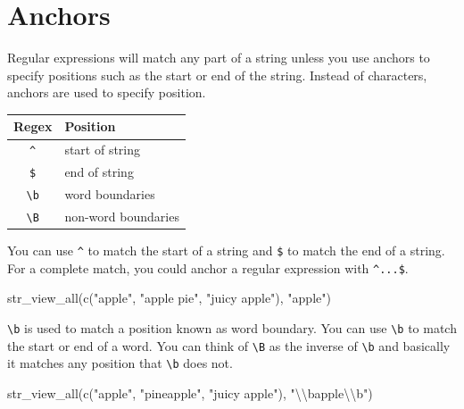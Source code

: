 \documentclass[
]{book}
\newenvironment{Shaded}{\begin{snugshade}}{\end{snugshade}}
\newcommand{\FunctionTok}[1]{\textcolor[rgb]{0.00,0.00,0.00}{#1}}
\newcommand{\NormalTok}[1]{#1}
\newcommand{\SpecialCharTok}[1]{\textcolor[rgb]{0.00,0.00,0.00}{#1}}
\newcommand{\StringTok}[1]{\textcolor[rgb]{0.31,0.60,0.02}{#1}}
\begin{document}
\hypertarget{anchors}{%
\section{Anchors}\label{anchors}}

Regular expressions will match any part of a string unless you use anchors to specify positions such as the start or end of the string. Instead of characters, anchors are used to specify position.

\begin{longtable}[]{@{}cl@{}}
\toprule
Regex & Position \\
\midrule
\endhead
\texttt{\^{}} & start of string \\
\texttt{\$} & end of string \\
\texttt{\textbackslash{}b} & word boundaries \\
\texttt{\textbackslash{}B} & non-word boundaries \\
\bottomrule
\end{longtable}

You can use \texttt{\^{}} to match the start of a string and \texttt{\$} to match the end of a string. For a complete match, you could anchor a regular expression with \texttt{\^{}...\$}.

\begin{Shaded}
\begin{Highlighting}[]
\FunctionTok{str\_view\_all}\NormalTok{(}\FunctionTok{c}\NormalTok{(}\StringTok{"apple"}\NormalTok{, }\StringTok{"apple pie"}\NormalTok{, }\StringTok{"juicy apple"}\NormalTok{), }\StringTok{"apple"}\NormalTok{)}
\end{Highlighting}
\end{Shaded}

\texttt{\textbackslash{}b} is used to match a position known as word boundary. You can use \texttt{\textbackslash{}b} to match the start or end of a word. You can think of \texttt{\textbackslash{}B} as the inverse of \texttt{\textbackslash{}b} and basically it matches any position that \texttt{\textbackslash{}b} does not.

\begin{Shaded}
\begin{Highlighting}[]
\FunctionTok{str\_view\_all}\NormalTok{(}\FunctionTok{c}\NormalTok{(}\StringTok{"apple"}\NormalTok{, }\StringTok{"pineapple"}\NormalTok{, }\StringTok{"juicy apple"}\NormalTok{), }\StringTok{"}\SpecialCharTok{\textbackslash{}\textbackslash{}}\StringTok{bapple}\SpecialCharTok{\textbackslash{}\textbackslash{}}\StringTok{b"}\NormalTok{)}
\end{Highlighting}
\end{Shaded}
\end{document}
